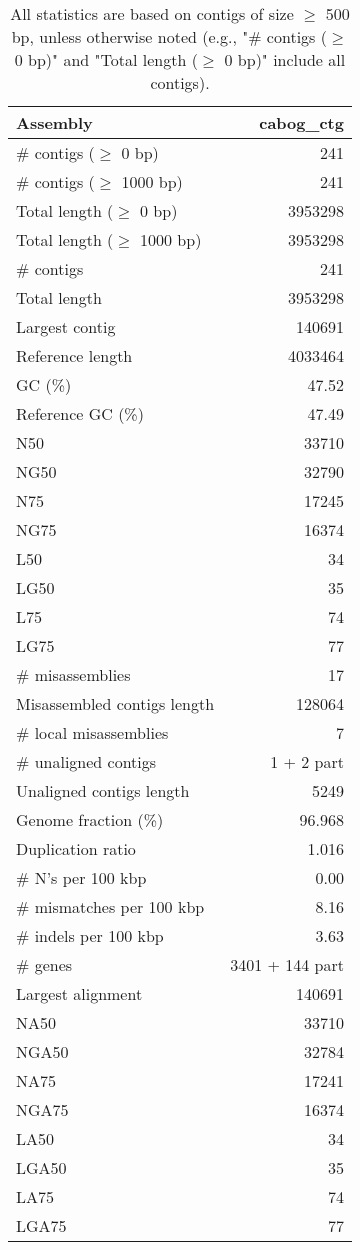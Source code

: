 \documentclass[12pt,a4paper]{article}
\begin{document}
\begin{table}[ht]
\begin{center}
\caption{All statistics are based on contigs of size $\geq$ 500 bp, unless otherwise noted (e.g., "\# contigs ($\geq$ 0 bp)" and "Total length ($\geq$ 0 bp)" include all contigs).}
\begin{tabular}{|l*{1}{|r}|}
\hline
Assembly & cabog\_ctg \\ \hline
\# contigs ($\geq$ 0 bp) & 241 \\ \hline
\# contigs ($\geq$ 1000 bp) & 241 \\ \hline
Total length ($\geq$ 0 bp) & 3953298 \\ \hline
Total length ($\geq$ 1000 bp) & 3953298 \\ \hline
\# contigs & 241 \\ \hline
Total length & 3953298 \\ \hline
Largest contig & 140691 \\ \hline
Reference length & 4033464 \\ \hline
GC (\%) & 47.52 \\ \hline
Reference GC (\%) & 47.49 \\ \hline
N50 & 33710 \\ \hline
NG50 & 32790 \\ \hline
N75 & 17245 \\ \hline
NG75 & 16374 \\ \hline
L50 & 34 \\ \hline
LG50 & 35 \\ \hline
L75 & 74 \\ \hline
LG75 & 77 \\ \hline
\# misassemblies & 17 \\ \hline
Misassembled contigs length & 128064 \\ \hline
\# local misassemblies & 7 \\ \hline
\# unaligned contigs & 1 + 2 part \\ \hline
Unaligned contigs length & 5249 \\ \hline
Genome fraction (\%) & 96.968 \\ \hline
Duplication ratio & 1.016 \\ \hline
\# N's per 100 kbp & 0.00 \\ \hline
\# mismatches per 100 kbp & 8.16 \\ \hline
\# indels per 100 kbp & 3.63 \\ \hline
\# genes & 3401 + 144 part \\ \hline
Largest alignment & 140691 \\ \hline
NA50 & 33710 \\ \hline
NGA50 & 32784 \\ \hline
NA75 & 17241 \\ \hline
NGA75 & 16374 \\ \hline
LA50 & 34 \\ \hline
LGA50 & 35 \\ \hline
LA75 & 74 \\ \hline
LGA75 & 77 \\ \hline
\end{tabular}
\end{center}
\end{table}
\end{document}

